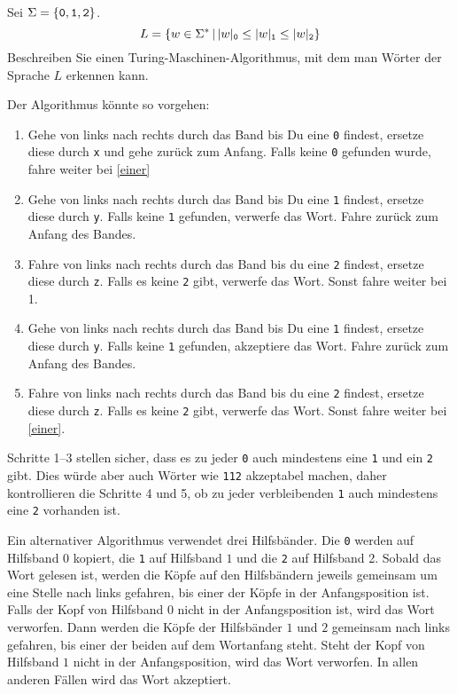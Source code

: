 Sei $\Sigma=\{{\tt 0},{\tt 1},{\tt 2}\}$.
\[
L=\{
w\in\Sigma^*
\,|\,
|w|_{\tt 0} \le
|w|_{\tt 1} \le
|w|_{\tt 2}
\}
\]
Beschreiben Sie einen Turing-Maschinen-Algorithmus, mit dem man Wörter der
Sprache $L$ erkennen kann.

\begin{loesung}
Der Algorithmus könnte so vorgehen:
\begin{enumerate}
\item Gehe von links nach rechts durch das Band bis Du eine
{\tt 0} findest, ersetze diese durch {\tt x} und gehe zurück
zum Anfang. Falls keine {\tt 0} gefunden wurde, fahre weiter bei
\ref{einer}
\item
Gehe von links nach rechts durch das Band bis Du eine
{\tt 1} findest, ersetze diese durch {\tt y}. Falls keine {\tt 1}
gefunden, verwerfe das Wort. Fahre zurück zum Anfang des Bandes.
\item Fahre von links nach rechts durch das Band bis du eine
{\tt 2} findest, ersetze diese durch {\tt z}. Falls es keine {\tt 2}
gibt, verwerfe das Wort. Sonst fahre weiter bei 1.
\item\label{einer}
Gehe von links nach rechts durch das Band bis Du eine
{\tt 1} findest, ersetze diese durch {\tt y}. Falls keine {\tt 1}
gefunden, akzeptiere das Wort. Fahre zurück zum Anfang des Bandes.
\item Fahre von links nach rechts durch das Band bis du eine
{\tt 2} findest, ersetze diese durch {\tt z}. Falls es keine {\tt 2}
gibt, verwerfe das Wort. Sonst fahre weiter bei \ref{einer}.
\end{enumerate}
Schritte 1--3 stellen sicher, dass es zu jeder {\tt 0} auch mindestens
eine {\tt 1} und ein {\tt 2} gibt. Dies würde aber auch Wörter wie
{\tt 112} akzeptabel machen, daher kontrollieren die Schritte 4 und 5,
ob zu jeder verbleibenden {\tt 1} auch mindestens eine {\tt 2}
vorhanden ist.

Ein alternativer Algorithmus verwendet drei Hilfsbänder.  Die {\tt 0}
werden auf Hilfsband $0$ kopiert, die {\tt 1} auf Hilfsband $1$ und
die {\tt 2} auf Hilfsband 2. Sobald das Wort gelesen ist, werden
die Köpfe auf den Hilfsbändern jeweils gemeinsam um eine Stelle nach
links gefahren, bis einer der Köpfe in der Anfangsposition ist.
Falls der Kopf von Hilfsband $0$ nicht in der Anfangsposition ist,
wird das Wort verworfen. Dann werden die Köpfe der Hilfsbänder $1$
und $2$ gemeinsam nach links gefahren, bis einer der beiden auf dem
Wortanfang steht. Steht der Kopf von Hilfsband $1$ nicht in der
Anfangsposition, wird das Wort verworfen. In allen anderen Fällen
wird das Wort akzeptiert.
\end{loesung}
